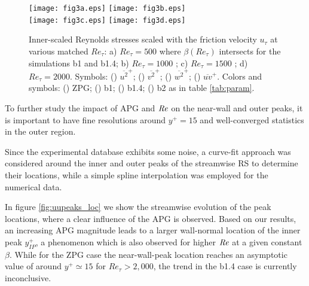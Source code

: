 \begin{figure}
\texttt{[image: fig3a.eps]}
\texttt{[image: fig3b.eps]} \\
\texttt{[image: fig3c.eps]}
\texttt{[image: fig3d.eps]}
  \caption{Inner-scaled Reynolds stresses scaled with the friction velocity $u_{\tau}$ at various matched $Re_{\tau}$: a) $Re_{\tau}=500$ where $\beta(Re_{\tau})$ intersects for the simulations b1 and b1.4; b) $Re_{\tau}=1000$ ; c) $Re_{\tau}=1500$ ; d) $Re_{\tau}=2000$. Symbols: (\protect\blackline) $\overline{u^2}^+$; (\protect\blackdotted) $\overline{v^2}^+$; (\protect\blackdash) $\overline{w^2}^+$; (\protect\blackdashdot) $\overline{uv}^+$. Colors and symbols: (\protect\blackline) ZPG; (\protect\redline) b1; (\protect\orangeline) b1.4; (\protect\greenline) b2 as in table \ref{tab:param}.}
\label{fig:RSinner}
\end{figure}

To further study the impact of APG and $\mbox{\textit{Re}}$ on the near-wall and outer peaks, it is important to have fine resolutions around $y^+=15$ and well-converged statistics in the outer region. 

Since the experimental database exhibits some noise, a curve-fit approach was considered around the inner and outer peaks of the streamwise RS to determine their locations, while a simple spline interpolation was employed for the numerical data.

In figure \ref{fig:uupeaks_loc} we show the streamwise evolution of the peak locations, where a clear influence of the APG is observed. Based on our results, an increasing APG magnitude leads to a larger wall-normal location of the inner peak $y^+_{IP}$, a phenomenon which is also observed for higher $\mbox{\textit{Re}}$ at a given constant $\beta$. While for the ZPG case the near-wall-peak location reaches an asymptotic value of around $y^+ \simeq 15$ for $Re_{\tau} >2,000$, the trend in the b1.4 case is currently inconclusive.


